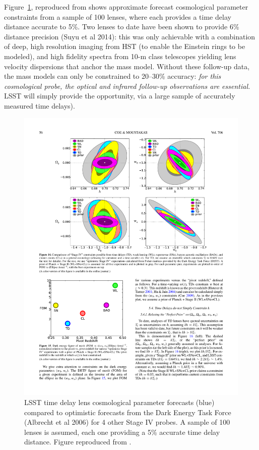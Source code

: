 Figure~\ref{fig:sl_forecast}, reproduced from \citet{Coe+Moustakas2009}
shows approximate forecast cosmological  parameter constraints from a
sample of 100 lenses, where each provides a  time delay distance
accurate to 5\%. Two lenses to date have been  shown to provide 6\%
distance precision (Suyu et al 2014): this was only  achievable with a
combination of deep, high resolution imaging from HST (to enable the
Einstein rings to be modeled), and high fidelity spectra from 10-m class
telescopes yielding lens velocity dispersions that anchor the mass
model. Without these follow-up data, the mass models can only be
constrained to 20--30\% accuracy: {\it for this cosmological probe, the
optical and infrared follow-up observations are essential.} LSST will
simply provide the opportunity, via a large sample of accurately
measured time delays).

\begin{figure}[!t]
    \centering\includegraphics[width=0.9\linewidth]{figs/Coe+Moustakas2009_Figure14.pdf}
    \caption{LSST time delay lens cosmological parameter forecasts (blue)
    compared to optimistic forecasts from the Dark
    Energy Task Force (Albrecht et al 2006) for 4 other Stage IV probes.
    A sample of 100 lenses is assumed, each one
    providing a 5\% accurate time delay distance. Figure reproduced from
    \citet{Coe+Moustakas2009}.}
    \label{fig:sl_forecast}
\end{figure}

